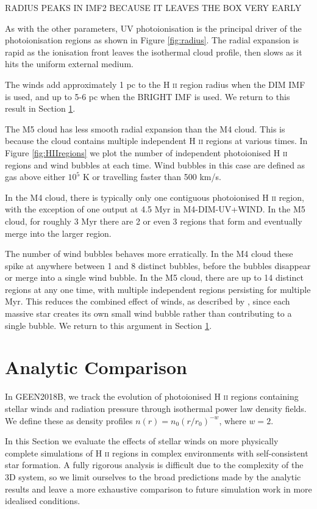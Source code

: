 \documentclass[a4paper,fleqn,usenatbib]{mnras}
\newcommand{\HII}{H \textsc{ii}\xspace}
\begin{document}
RADIUS PEAKS IN IMF2 BECAUSE IT LEAVES THE BOX VERY EARLY

As with the other parameters, UV photoionisation is the principal driver of the photoionisation regions as shown in Figure \ref{fig:radius}. The radial expansion is rapid as the ionisation front leaves the isothermal cloud profile, then slows as it hits the uniform external medium.

The winds add approximately 1 pc to the \HII region radius when the DIM IMF is used, and up to 5-6 pc when the BRIGHT IMF is used. We return to this result in Section \ref{analytic_comparison}.

The M5 cloud has less smooth radial expansion than the M4 cloud. This is because the cloud contains multiple independent \HII regions at various times. In Figure \ref{fig:HIIregions} we plot the number of independent photoionised \HII regions and wind bubbles at each time. Wind bubbles in this case are defined as gas above either $10^5$ K or travelling faster than 500 km/s.

In the M4 cloud, there is typically only one contiguous photoionised \HII region, with the exception of one output at 4.5 Myr in M4-DIM-UV+WIND. In the M5 cloud, for roughly 3 Myr there are 2 or even 3 regions that form and eventually merge into the larger region.

The number of wind bubbles behaves more erratically. In the M4 cloud these spike at anywhere between 1 and 8 distinct bubbles, before the bubbles disappear or merge into a single wind bubble. In the M5 cloud, there are up to 14 distinct regions at any one time, with multiple independent regions persisting for multiple Myr. This reduces the combined effect of winds, as described by \cite{Silich2017}, since each massive star creates its own small wind bubble rather than contributing to a single bubble. We return to this argument in Section \ref{analytic_comparison}.

\section{Analytic Comparison}
\label{analytic_comparison}

In GEEN2018B, we track the evolution of photoionised \HII regions containing stellar winds and radiation pressure through isothermal power law density fields. We define these as density profiles $n(r) = n_0 (r / r_0)^{-w}$, where $w=2$. 

In this Section we evaluate the effects of stellar winds on more physically complete simulations of \HII regions in complex environments with self-consistent star formation. A fully rigorous analysis is difficult due to the complexity of the 3D system, so we limit ourselves to the broad predictions made by the analytic results and leave a more exhaustive comparison to future simulation work in more idealised conditions.
\end{document}
